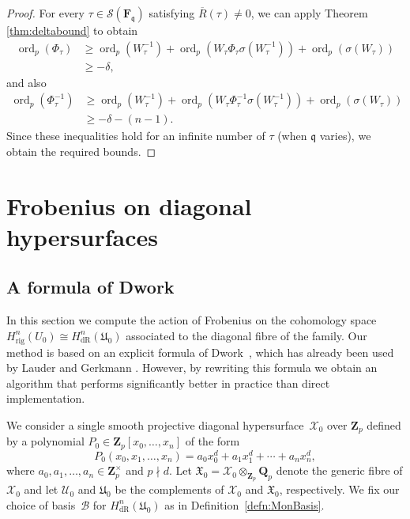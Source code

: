 \documentclass[a4paper,11pt]{article}
\numberwithin{equation}{section}
\newcommand{\ZZ}{\mathbf{Z}} %
\newcommand{\QQ}{\mathbf{Q}} %
\newcommand{\FF}{\mathbf{F}} %
\DeclareMathOperator{\ord}{ord}          %
\providecommand{\HdR}{H_{\text{dR}}}    %
\providecommand{\Hrig}{H_{\text{rig}}}  %
\providecommand{\cB}{\mathcal{B}} %
\theoremstyle{definition}
\begin{document}
\begin{proof}
For every $\tau \in \mathcal{S}(\FF_{\mathfrak{q}})$ satisfying $\overline{R}(\tau) \neq 0$, we can apply Theorem
\ref{thm:deltabound} to obtain
\begin{align*}
\ord_p(\Phi_{\tau}) &\geq \ord_p(W^{-1}_{\tau}) + \ord_p(W_{\tau} \Phi_{\tau} \sigma(W_{\tau}^{-1})) + \ord_p(\sigma(W_{\tau})) \\
&\geq -\delta,
\end{align*}
and also
\begin{align*}
\ord_p(\Phi^{-1}_{\tau}) &\geq \ord_p(W^{-1}_{\tau}) + \ord_p(W_{\tau} \Phi^{-1}_{\tau} \sigma(W_{\tau}^{-1})) + \ord_p(\sigma(W_{\tau})) \\
&\geq -\delta - (n-1).
\end{align*}
Since these inequalities hold for an infinite number of $\tau$ (when $\mathfrak{q}$ varies), we obtain the required bounds.
\end{proof}


\section{Frobenius on diagonal hypersurfaces}
\label{sec:Diagonal}

\subsection{A formula of Dwork}

In this section we compute the action of Frobenius on the cohomology 
space $\Hrig^{n}(U_0) \cong \HdR^{n}(\mathfrak{U}_0)$ associated 
to the diagonal fibre of the family. Our method is based on an 
explicit formula of Dwork~\citep[\S 4]{Dwork1964}, which has already 
been used by Lauder \cite{Lauder2004b} and Gerkmann 
\cite{Gerkmann2007}. However, by rewriting this formula we obtain an 
algorithm that performs significantly better in practice than direct 
implementation.

We consider a single smooth 
projective diagonal hypersurface~$\mathcal{X}_0$ over $\ZZ_p$ defined by 
a polynomial $P_0 \in \ZZ_p[x_0, \dotsc, x_n]$ of the form
\begin{equation*}
P_0(x_0, x_1, \dotsc, x_n) = 
    a_0 x_0^d + a_1 x_1^d + \dotsb + a_n x_n^d,
\end{equation*}
where $a_0, a_1, \dotsc, a_n \in \ZZ_p^{\times}$ and $p \nmid d$. 
Let $\mathfrak{X}_0 = \mathcal{X}_0 \otimes_{\ZZ_p} \QQ_p$ denote the generic 
fibre of $\mathcal{X}_0$ and let $\mathcal{U}_0$ and $\mathfrak{U}_0$ be the complements
of $\mathcal{X}_0$ and $\mathfrak{X}_0$, respectively. 
We fix our choice of basis~$\cB$ for $\HdR^{n}(\mathfrak{U}_0)$ 
as in Definition~\ref{defn:MonBasis}. 
\end{document}
